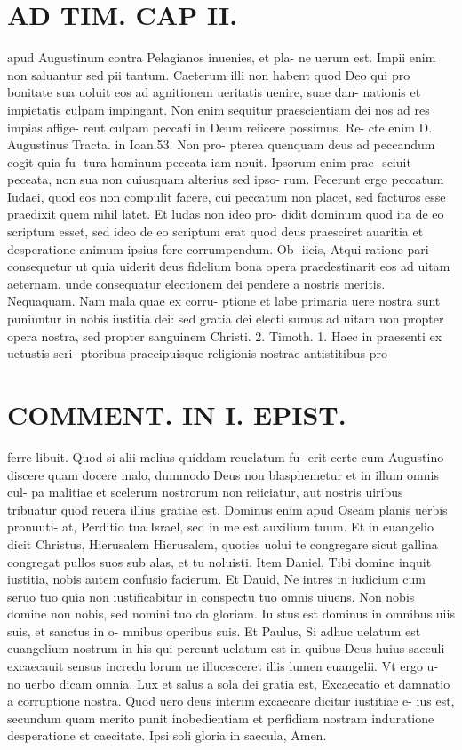 \documentclass{article}
\begin{document}
\begin{pages}
\section*{AD TIM. CAP II. }
\marginpar{[ p.115 ]}\pstart apud Augustinum contra Pelagianos inuenies, et pla- ne uerum est. Impii enim non saluantur sed pii tantum. Caeterum illi non habent quod Deo qui pro bonitate sua uoluit eos ad agnitionem ueritatis uenire, suae dan- nationis et impietatis culpam impingant. Non enim sequitur praescientiam dei nos ad res impias affige- reut culpam peccati in Deum reiicere possimus. Re- cte enim D. Augustinus Tracta. in Ioan.53. Non pro- pterea quenquam deus ad peccandum cogit quia fu- tura hominum peccata iam nouit. Ipsorum enim prae- sciuit peceata, non sua non cuiusquam alterius sed ipso- rum. Fecerunt ergo peccatum Iudaei, quod eos non compulit facere, cui peccatum non placet, sed facturos esse praedixit quem nihil latet. Et ludas non ideo pro- didit dominum quod ita de eo scriptum esset, sed ideo de eo scriptum erat quod deus praesciret auaritia et desperatione animum ipsius fore corrumpendum. Ob- iicis, Atqui ratione pari consequetur ut quia uiderit deus fidelium bona opera praedestinarit eos ad uitam aeternam, unde consequatur electionem dei pendere a nostris meritis. Nequaquam. Nam mala quae ex corru- ptione et labe primaria uere nostra sunt puniuntur in nobis iustitia dei: sed gratia dei electi sumus ad uitam uon propter opera nostra, sed propter sanguinem Christi. 2. Timoth. 1. Haec in praesenti ex uetustis scri- ptoribus praecipuisque religionis nostrae antistitibus pro  \pend
\section*{COMMENT. IN I. EPIST. }\pstart ferre libuit. Quod si alii melius quiddam reuelatum fu- erit certe cum Augustino discere quam docere malo, dummodo Deus non blasphemetur et in illum omnis cul- pa malitiae et scelerum nostrorum non reiiciatur, aut nostris uiribus tribuatur quod reuera illius gratiae est. Dominus enim apud Oseam planis uerbis pronuuti- at, Perditio tua Israel, sed in me est auxilium tuum. Et in euangelio dicit Christus, Hierusalem Hierusalem, quoties uolui te congregare sicut gallina congregat pullos suos sub alas, et tu noluisti. Item Daniel, Tibi domine inquit iustitia, nobis autem confusio facierum. Et Dauid, Ne intres in iudicium cum seruo tuo quia non iustificabitur in conspectu tuo omnis uiuens. Non nobis domine non nobis, sed nomini tuo da gloriam. Iu stus est dominus in omnibus uiis suis, et sanctus in o- mnibus operibus suis. Et Paulus, Si adhuc uelatum est euangelium nostrum in his qui pereunt uelatum est in quibus Deus huius saeculi excaecauit sensus incredu lorum ne illucesceret illis lumen euangelii. Vt ergo u- no uerbo dicam omnia, Lux et salus a sola dei gratia est, Excaecatio et damnatio a corruptione nostra. Quod uero deus interim excaecare dicitur iustitiae e- ius est, secundum quam merito punit inobedientiam et perfidiam nostram induratione desperatione et caecitate. Ipsi soli gloria in saecula, Amen.  \pend

\end{pages}
\end{document}
